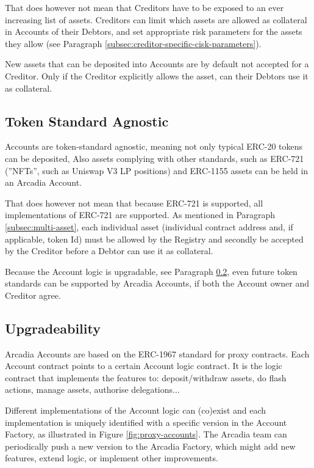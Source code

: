 \documentclass[sigconf,nonacm]{acmart}
\begin{document}
That does however not mean that Creditors have to be exposed to an ever increasing list of assets.
Creditors can limit which assets are allowed as collateral in Accounts of their Debtors,
and set appropriate risk parameters for the assets they allow (see Paragraph \ref{subsec:creditor-specific-cisk-parameters}).

New assets that can be deposited into Accounts are by default not accepted for a Creditor.
Only if the Creditor explicitly allows the asset, can their Debtors use it as collateral.

\subsection{Token Standard Agnostic}
Accounts are token-standard agnostic, meaning not only typical ERC-20 tokens can be deposited,
Also assets complying with other standards, such as ERC-721 (”NFTs”, such as Uniswap V3 LP positions) and ERC-1155 assets can be held in an Arcadia Account.

That does however not mean that because ERC-721 is supported, all implementations of ERC-721 are supported.
As mentioned in Paragraph \ref{subsec:multi-asset}, each individual asset (individual contract address and, if applicable, token Id)
must be allowed by the Registry and secondly be accepted by the Creditor before a Debtor can use it as collateral.

Because the Account logic is upgradable, see Paragraph \ref{subsec:upgradeability}, even future token standards can be supported by Arcadia Accounts,
if both the Account owner and Creditor agree.

\subsection{Upgradeability}
\label{subsec:upgradeability}

Arcadia Accounts are based on the ERC-1967 standard for proxy contracts.
Each Account contract points to a certain Account logic contract.
It is the logic contract that implements the features to: deposit/withdraw assets, do flash actions, manage assets, authorise delegations...

Different implementations of the Account logic can (co)exist and each implementation is uniquely identified with a specific version in the Account Factory,
as illustrated in Figure \ref{fig:proxy-accounts}.
The Arcadia team can periodically push a new version to the Arcadia Factory, which might add new features, extend logic, or implement other improvements.
\end{document}
